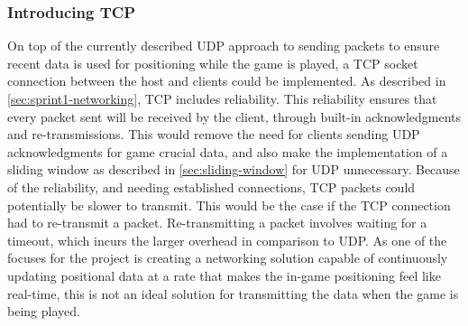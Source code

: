 \subsubsection{Introducing TCP}
On top of the currently described UDP approach to sending packets to ensure recent data is used for positioning while the game is played, a TCP socket connection between the host and clients could be implemented.
As described in \autoref{sec:sprint1-networking}, TCP includes reliability.
This reliability ensures that every packet sent will be received by the client, through built-in acknowledgments and re-transmissions.
This would remove the need for clients sending UDP acknowledgments for game crucial data, and also make the implementation of a sliding window as described in \autoref{sec:sliding-window} for UDP unnecessary.
Because of the reliability, and needing established connections, TCP packets could potentially be slower to transmit.
This would be the case if the TCP connection had to re-transmit a packet.
Re-transmitting a packet involves waiting for a timeout, which incurs the larger overhead in comparison to UDP.
As one of the focuses for the project is creating a networking solution capable of continuously updating positional data at a rate that makes the in-game positioning feel like real-time, this is not an ideal solution for transmitting the data when the game is being played.
